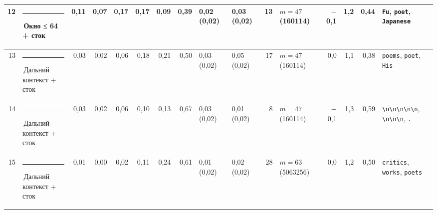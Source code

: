 \documentclass[10pt]{article}
\begin{document}
\begin{minipage}{\linewidth}
\begin{center}
{\begin{tabular}{|r|l|r|r|r|r|r|r|l|l|r|l|r|r|r|l|}
12 & \textcolor[HTML]{EDA100}{\rule{0.62em}{0.62em}}\,\textbf{Окно ≤ 64 + сток} & 0,11 & 0,07 & 0,17 & 0,17 & 0,09 & 0,39 & 0,02 (0,02) & 0,03 (0,02) & 13 & $m{=}47$ (160114) & $-$0,1 & 1,2 & 0,44 & \texttt{\textvisiblespace{}Fu}, \texttt{\textvisiblespace{}poet}, \texttt{\textvisiblespace{}Japanese} \\ \hline
13 & \textcolor[HTML]{C3C2B7}{\rule{0.62em}{0.62em}}\,Дальний контекст + сток & 0,03 & 0,02 & 0,06 & 0,18 & 0,21 & 0,50 & 0,03 (0,02) & 0,05 (0,02) & 17 & $m{=}47$ (160114) & 0,0 & 1,1 & 0,38 & \texttt{\textvisiblespace{}poems}, \texttt{\textvisiblespace{}poet}, \texttt{\textvisiblespace{}His} \\ \hline
14 & \textcolor[HTML]{C3C2B7}{\rule{0.62em}{0.62em}}\,Дальний контекст + сток & 0,03 & 0,02 & 0,06 & 0,10 & 0,13 & 0,67 & 0,03 (0,02) & 0,01 (0,02) & 8 & $m{=}47$ (160114) & $-$0,1 & 1,3 & 0,59 & \texttt{\textvisiblespace{}\textbackslash{}n\textbackslash{}n\textbackslash{}n\textbackslash{}n\textbackslash{}n}, \texttt{\textvisiblespace{}\textbackslash{}n\textbackslash{}n\textbackslash{}n}, \texttt{\textvisiblespace{}.} \\ \hline
15 & \textcolor[HTML]{C3C2B7}{\rule{0.62em}{0.62em}}\,Дальний контекст + сток & 0,01 & 0,00 & 0,02 & 0,11 & 0,24 & 0,61 & 0,01 (0,02) & 0,02 (0,02) & 28 & $m{=}63$ (5063256) & 0,0 & 1,2 & 0,50 & \texttt{\textvisiblespace{}critics}, \texttt{\textvisiblespace{}works}, \texttt{\textvisiblespace{}poets} \\ \hline
\hline\end{tabular}}\end{center}
\end{minipage}
\par\vspace{0.4em}
\end{document}
